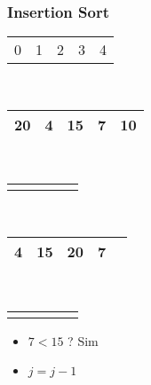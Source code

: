 \documentclass{beamer}
\begin{document}
\begin{frame}
    \frametitle{Insertion Sort}
    \begin{center}
        \begin{table}
            \begin{tabular}{p{0.25cm} p{0.25cm} p{0.25cm} p{0.25cm} p{0.25cm}}
                0 & 1 & 2 & 3 & 4
            \end{tabular} \\
            \begin{tabular}{| p{0.25cm} | p{0.25cm} | p{0.25cm} | p{0.25cm} | p{0.25cm} |}
                \hline
                20 & 4 & 15 & 7 & 10 \\ \hline
            \end{tabular} \\
            \begin{tabular}{p{0.25cm} p{0.25cm} p{0.25cm} p{0.25cm} p{0.25cm}}
                & & & \color{blue}{$\updownarrow$} &
            \end{tabular} \\
            \begin{tabular}{| p{0.25cm} | p{0.25cm} | p{0.25cm} | p{0.25cm} | p{0.25cm} |}
                \hline
                4 & 15 & 20 & 7 & \\ \hline
            \end{tabular} \\
            \begin{tabular}{p{0.25cm} p{0.25cm} p{0.25cm} p{0.25cm} p{0.25cm}}
                & \color{red}{$\uparrow$} & & \color{blue}{$\uparrow$} &
            \end{tabular}
        \end{table}
	\end{center}
    \begin{itemize}[<+->]
        \item $7 < 15$ ? Sim
        \item $j = j - 1$
    \end{itemize}
\end{frame}
\end{document}
